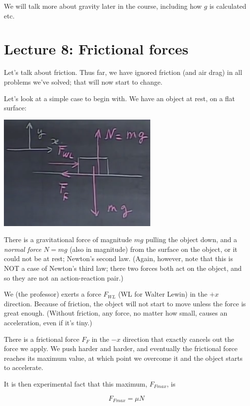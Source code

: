 \documentclass[12pt,a4paper]{report}
\begin{document}
We will talk more about gravity later in the course, including how $g$ is calculated etc.

\section{Lecture 8: Frictional forces}

Let's talk about friction. Thus far, we have ignored friction (and air drag) in all problems we've solved; that will now start to change.

Let's look at a simple case to begin with. We have an object at rest, on a flat surface:

\begin{center}
\includegraphics[scale=0.8]{Graphics/lec8_friction}
\end{center}

There is a gravitational force of magnitude $m g$ pulling the object down, and a \emph{normal force} $N = m g$ (also in magnitude) from the surface on the object, or it could not be at rest; Newton's second law. (Again, however, note that this is NOT a case of Newton's third law; there two forces both act on the object, and so they are not an action-reaction pair.)

We (the professor) exerts a force $F_{WL}$ (WL for Walter Lewin) in the $+x$ direction. Because of friction, the object will not start to move unless the force is great enough. (Without friction, any force, no matter how small, causes an acceleration, even if it's tiny.)

There is a frictional force $F_F$ in the $-x$ direction that exactly cancels out the force we apply. We push harder and harder, and eventually the frictional force reaches its maximum value, at which point we overcome it and the object starts to accelerate.

It is then experimental fact that this maximum, $F_{Fmax}$, is

\begin{equation}
F_{Fmax} = \mu N
\end{equation}
\end{document}
